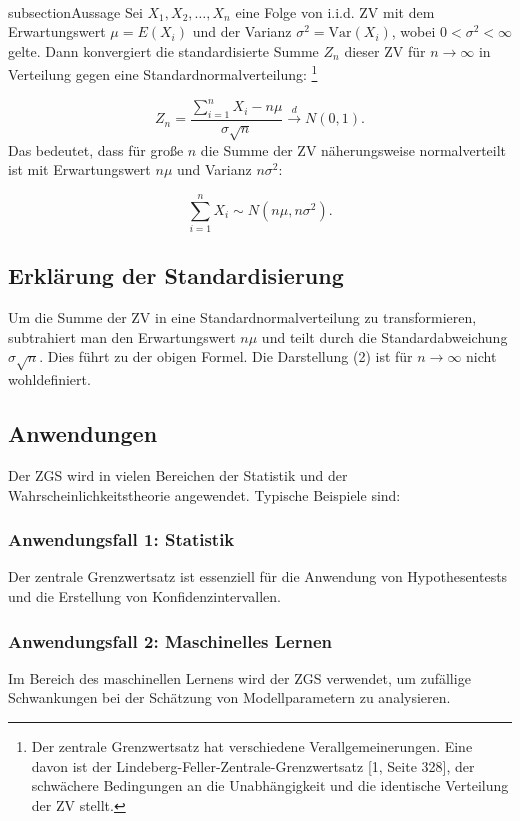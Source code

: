 \documentclass[a4paper,12pt]{article}
\begin{document}
\\subsection{Aussage}
Sei \( X_1, X_2, \ldots, X_n \) eine Folge von i.i.d. ZV mit dem Erwartungswert \( \mu = E(X_i) \)
und der Varianz \( \sigma^2 = \text{Var}(X_i) \), wobei \( 0 < \sigma^2 < \infty \) gelte. Dann konvergiert
die standardisierte Summe \( Z_n \) dieser ZV für \( n \to \infty \) in Verteilung gegen eine Standardnormalverteilung:%
\footnote{Der zentrale Grenzwertsatz hat verschiedene Verallgemeinerungen. Eine davon ist der Lindeberg-Feller-Zentrale-Grenzwertsatz [1, Seite 328], der schwächere Bedingungen an die Unabhängigkeit und die identische Verteilung der ZV stellt.}


\[
Z_n = \frac{\sum_{i=1}^n X_i - n\mu}{\sigma \sqrt{n}} \xrightarrow{d} N(0, 1).
\]
Das bedeutet, dass für große \( n \) die Summe der ZV näherungsweise normalverteilt ist mit Erwartungswert \( n\mu \) und Varianz \( n\sigma^2 \):

\[
\sum_{i=1}^n X_i \sim N(n\mu, n\sigma^2).
\]

\subsection{Erklärung der Standardisierung}
Um die Summe der ZV in eine Standardnormalverteilung zu transformieren, subtrahiert man den Erwartungswert \( n\mu \) und teilt durch die Standardabweichung \( \sigma \sqrt{n} \). Dies führt zu der obigen Formel. Die Darstellung (2) ist für \( n \to \infty \) nicht wohldefiniert.

\subsection{Anwendungen}
Der ZGS wird in vielen Bereichen der Statistik und der Wahrscheinlichkeitstheorie angewendet. Typische Beispiele sind:


\subsubsection{Anwendungsfall 1: Statistik}
Der zentrale Grenzwertsatz ist essenziell für die Anwendung von Hypothesentests und die Erstellung von Konfidenzintervallen.

\subsubsection{Anwendungsfall 2: Maschinelles Lernen}
Im Bereich des maschinellen Lernens wird der ZGS verwendet, um zufällige Schwankungen bei der Schätzung von Modellparametern zu analysieren.
\end{document}
